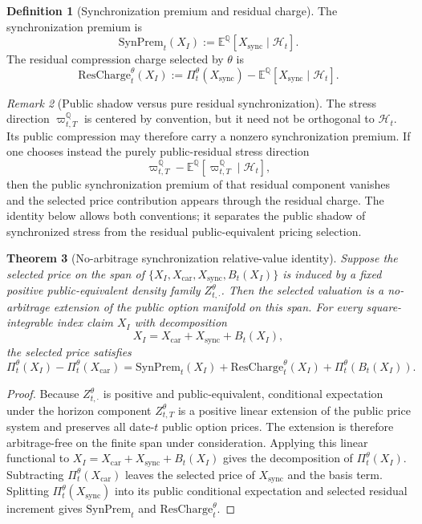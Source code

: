 \documentclass[11pt,a4paper]{amsart}
\theoremstyle{plain}
\newtheorem{theorem}{Theorem}[section]
\theoremstyle{definition}
\newtheorem{definition}[theorem]{Definition}
\theoremstyle{remark}
\newtheorem{remark}[theorem]{Remark}
\newcommand{\QQ}{\mathbb{Q}}
\newcommand{\EE}{\mathbb{E}}
\newcommand{\cH}{\mathcal{H}}
\begin{document}
\begin{definition}[Synchronization premium and residual charge]\label{def:sync-premium-charge}
The synchronization premium is
\[
        \mathrm{SynPrem}_t(X_I)
        :=
        \EE^\QQ[X_{\mathrm{sync}}\mid\cH_t].
\]
The residual compression charge selected by \(\theta\) is
\[
        \mathrm{ResCharge}_t^\theta(X_I)
        :=
        \Pi_t^\theta(X_{\mathrm{sync}})
        -
        \EE^\QQ[X_{\mathrm{sync}}\mid\cH_t].
\]
\end{definition}

\begin{remark}[Public shadow versus pure residual synchronization]\label{rem:sync-public-shadow}
The stress direction \(\varpi_{t,T}^\QQ\) is centered by convention, but it need not be
orthogonal to \(\cH_t\).  Its public compression may therefore carry a nonzero synchronization
premium.  If one chooses instead the purely public-residual stress direction
\[
        \varpi_{t,T}^\QQ-\EE^\QQ[\varpi_{t,T}^\QQ\mid\cH_t],
\]
then the public synchronization premium of that residual component vanishes and the selected
price contribution appears through the residual charge.  The identity below allows both
conventions; it separates the public shadow of synchronized stress from the residual
public-equivalent pricing selection.
\end{remark}

\begin{theorem}[No-arbitrage synchronization relative-value identity]\label{thm:rv-identity}
Suppose the selected price on the span of
\(\{X_I,X_{\mathrm{car}},X_{\mathrm{sync}},B_t(X_I)\}\) is induced by a fixed positive
public-equivalent density family \(Z^\theta_{t,\cdot}\).  Then the selected valuation is a
no-arbitrage extension of the public option manifold on this span.  For every square-integrable index claim
\(X_I\) with decomposition
\[
        X_I=X_{\mathrm{car}}+X_{\mathrm{sync}}+B_t(X_I),
\]
the selected price satisfies
\[
        \Pi_t^\theta(X_I)-\Pi_t^\theta(X_{\mathrm{car}})
        =
        \mathrm{SynPrem}_t(X_I)
        +
        \mathrm{ResCharge}_t^\theta(X_I)
        +
        \Pi_t^\theta(B_t(X_I)).
\]
\end{theorem}

\begin{proof}
Because \(Z^\theta_{t,\cdot}\) is positive and public-equivalent, conditional expectation under
the horizon component \(Z^\theta_{t,T}\) is a positive linear extension of the public price system
and preserves all date-\(t\) public option prices.  The extension is therefore arbitrage-free on
the finite span under consideration.  Applying this linear functional to
\(X_I=X_{\mathrm{car}}+X_{\mathrm{sync}}+B_t(X_I)\) gives the decomposition of
\(\Pi_t^\theta(X_I)\).  Subtracting \(\Pi_t^\theta(X_{\mathrm{car}})\) leaves the selected price of
\(X_{\mathrm{sync}}\) and the basis term.  Splitting \(\Pi_t^\theta(X_{\mathrm{sync}})\) into its
public conditional expectation and selected residual increment gives \(\mathrm{SynPrem}_t\) and
\(\mathrm{ResCharge}_t^\theta\).
\end{proof}
\end{document}
